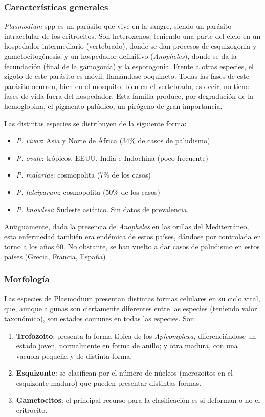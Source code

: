 \subsubsection{Características generales}
\textit{Plasmodium} spp es un parásito que vive en la sangre, siendo un parásito intracelular de los eritrocitos. Son heteroxenos, teniendo una parte del ciclo en un hospedador intermediario (vertebrado), donde se dan procesos de esquizogonia y gametocitogénesis; y un hospedador definitivo (\textit{Anopheles}), donde se da la fecundación (final de la gamogonia) y la esporogonia. Frente a otras especies, el zigoto de este parásito es móvil, llamándose ooquineto. Todas las fases de este parásito ocurren, bien en el mosquito, bien en el vertebrado, es decir, no tiene fases de vida fuera del hospedador. Esta familia produce, por degradación de la hemoglobina, el pigmento palúdico, un pirógeno de gran importancia.

Las distintas especies se distribuyen de la siguiente forma:
\begin{itemize}[itemsep=0pt,parsep=0pt,topsep=0pt,partopsep=0pt]
	\item\textit{P. vivax}: Asia y Norte de África (34\% de casos de paludismo)
	\item\textit{P. ovale}: trópicos, EEUU, India e Indochina (poco frecuente)
	\item\textit{P. malariae}: cosmopolita (7\% de los casos)
	\item\textit{P. falciparum}: cosmopolita (50\% de los casos)
	\item\textit{P. knowlesi}: Sudeste asiático. Sin datos de prevalencia.
\end{itemize}

Antiguamente, dada la presencia de \textit{Anopheles} en las orillas del Mediterráneo, esta enfermedad también era endémica de estos países, dándose por controlada en torno a los años 60. No obstante, se han vuelto a dar casos de paludismo en estos países (Grecia, Francia, España)
\subsubsection{Morfología}
Las especies de Plasmodium presentan distintas formas celulares en su ciclo vital, que, aunque algunas son ciertamente diferentes entre las especies (teniendo valor taxonómico), son estados comunes en todas las especies. Son:
\begin{enumerate}[itemsep=0pt,parsep=0pt,topsep=0pt,partopsep=0pt]
	\item\textbf{Trofozoito}: presenta la forma típica de los \textit{Apicomplexa}, diferenciándose un estado joven, normalmente en forma de anillo; y otra madura, con una vacuola pequeña y de distinta forma.
	\item\textbf{Esquizonte}: se clasifican por el número de núcleos (merozoitos en el esquizonte maduro) que pueden presentar distintas formas.
	\item\textbf{Gametocitos}: el principal recurso para la clasificación es si deforman o no el eritrocito. 
\end{enumerate}

